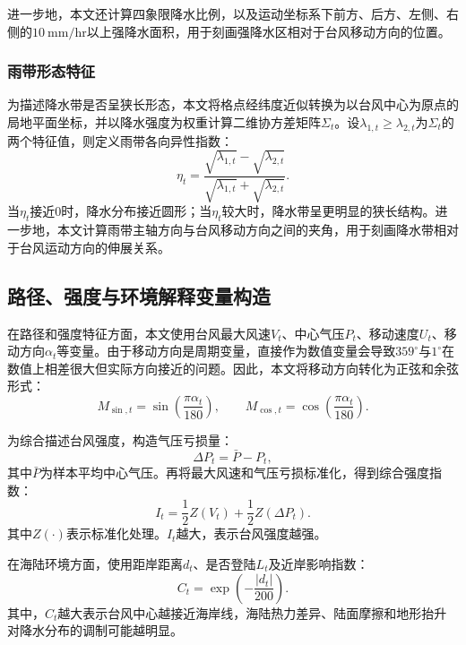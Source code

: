 \documentclass[UTF8,a4paper,zihao=5]{ctexart}
\numberwithin{equation}{section}
\numberwithin{figure}{section}
\numberwithin{table}{section}
\begin{document}
进一步地，本文还计算四象限降水比例，以及运动坐标系下前方、后方、左侧、右侧的$10\ \mathrm{mm/hr}$以上强降水面积，用于刻画强降水区相对于台风移动方向的位置。

\subsubsection{雨带形态特征}

为描述降水带是否呈狭长形态，本文将格点经纬度近似转换为以台风中心为原点的局地平面坐标，并以降水强度为权重计算二维协方差矩阵$\Sigma_t$。设$\lambda_{1,t}\geq\lambda_{2,t}$为$\Sigma_t$的两个特征值，则定义雨带各向异性指数：
\begin{equation}
    \eta_t=\frac{\sqrt{\lambda_{1,t}}-\sqrt{\lambda_{2,t}}}
    {\sqrt{\lambda_{1,t}}+\sqrt{\lambda_{2,t}}}.
\end{equation}
当$\eta_t$接近0时，降水分布接近圆形；当$\eta_t$较大时，降水带呈更明显的狭长结构。进一步地，本文计算雨带主轴方向与台风移动方向之间的夹角，用于刻画降水带相对于台风运动方向的伸展关系。

\subsection{路径、强度与环境解释变量构造}

在路径和强度特征方面，本文使用台风最大风速$V_t$、中心气压$P_t$、移动速度$U_t$、移动方向$\alpha_t$等变量。由于移动方向是周期变量，直接作为数值变量会导致$359^\circ$与$1^\circ$在数值上相差很大但实际方向接近的问题。因此，本文将移动方向转化为正弦和余弦形式：
\begin{equation}
    M_{\sin,t}=\sin\left(\frac{\pi\alpha_t}{180}\right),\qquad
    M_{\cos,t}=\cos\left(\frac{\pi\alpha_t}{180}\right).
\end{equation}

为综合描述台风强度，构造气压亏损量：
\begin{equation}
    \Delta P_t=\bar{P}-P_t,
\end{equation}
其中$\bar{P}$为样本平均中心气压。再将最大风速和气压亏损标准化，得到综合强度指数：
\begin{equation}
    I_t=\frac{1}{2}Z(V_t)+\frac{1}{2}Z(\Delta P_t).
\end{equation}
其中$Z(\cdot)$表示标准化处理。$I_t$越大，表示台风强度越强。

在海陆环境方面，使用距岸距离$d_t$、是否登陆$L_t$及近岸影响指数：
\begin{equation}
    C_t=\exp\left(-\frac{|d_t|}{200}\right).
\end{equation}
其中，$C_t$越大表示台风中心越接近海岸线，海陆热力差异、陆面摩擦和地形抬升对降水分布的调制可能越明显。
\end{document}
